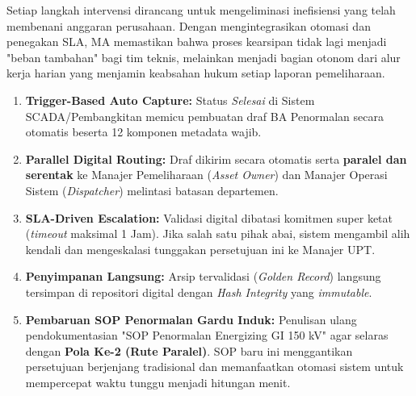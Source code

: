 \documentclass[12pt,a4paper]{report}
\begin{document}
Setiap langkah intervensi dirancang untuk mengeliminasi inefisiensi yang telah membenani anggaran perusahaan. Dengan mengintegrasikan otomasi dan penegakan SLA, MA memastikan bahwa proses kearsipan tidak lagi menjadi "beban tambahan" bagi tim teknis, melainkan menjadi bagian otonom dari alur kerja harian yang menjamin keabsahan hukum setiap laporan pemeliharaan.

\begin{enumerate}[leftmargin=*, nosep]
    \item \textbf{Trigger-Based Auto Capture:} Status \textit{Selesai} di Sistem SCADA/Pembangkitan memicu pembuatan draf BA Penormalan secara otomatis beserta 12 komponen metadata wajib.
    \item \textbf{Parallel Digital Routing:} Draf dikirim secara otomatis serta \textbf{paralel dan serentak} ke Manajer Pemeliharaan (\textit{Asset Owner}) dan Manajer Operasi Sistem (\textit{Dispatcher}) melintasi batasan departemen.
    \item \textbf{SLA-Driven Escalation:} Validasi digital dibatasi komitmen super ketat (\textit{timeout} maksimal 1 Jam). Jika salah satu pihak abai, sistem mengambil alih kendali dan mengeskalasi tunggakan persetujuan ini ke Manajer UPT.
    \item \textbf{Penyimpanan Langsung:} Arsip tervalidasi (\textit{Golden Record}) langsung tersimpan di repositori digital dengan \textit{Hash Integrity} yang \textit{immutable}.
    \item \textbf{Pembaruan SOP Penormalan Gardu Induk:} Penulisan ulang pendokumentasian "SOP Penormalan Energizing GI 150 kV" agar selaras dengan \textbf{Pola Ke-2 (Rute Paralel)}. SOP baru ini menggantikan persetujuan berjenjang tradisional dan memanfaatkan otomasi sistem untuk mempercepat waktu tunggu menjadi hitungan menit.
\end{enumerate}
\end{document}
